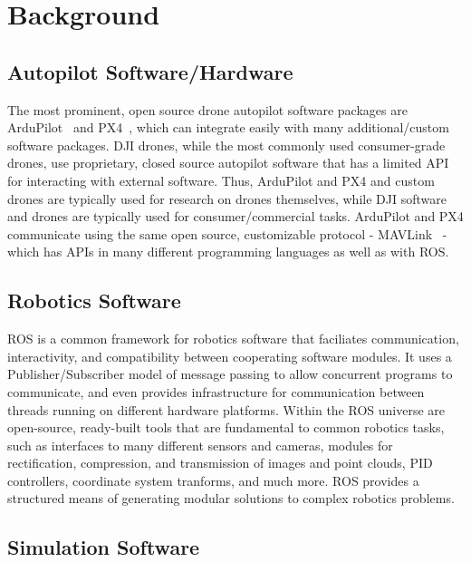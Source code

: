 \section{Background}

\subsection{Autopilot Software/Hardware}

The most prominent, open source drone autopilot software packages are ArduPilot~\cite{ardupilot_website} and PX4~\cite{pixhawk_website},
which can integrate easily with many additional/custom software packages.
DJI drones, while the most commonly used consumer-grade drones, use proprietary, closed source autopilot software
that has a limited API for interacting with external software.
Thus, ArduPilot and PX4 and custom drones are typically used for research on drones themselves,
while DJI software and drones are typically used for consumer/commercial tasks.
ArduPilot and PX4 communicate using the same open source, customizable protocol - MAVLink~\cite{mavlink_io} -
which has APIs in many different programming languages as well as with \gls{ROS}.

\subsection{Robotics Software}

\gls{ROS} is a common framework for robotics software that faciliates communication, interactivity, and compatibility
between cooperating software modules.
It uses a Publisher/Subscriber model of message passing to allow concurrent programs to communicate,
and even provides infrastructure for communication between threads running on different hardware platforms.
Within the ROS universe are open-source, ready-built tools that are fundamental to common robotics tasks,
such as interfaces to many different sensors and cameras,
modules for rectification, compression, and transmission of images and point clouds,
PID controllers,
coordinate system tranforms,
and much more.
ROS provides a structured means of generating modular solutions to complex robotics problems.

\subsection{Simulation Software}

